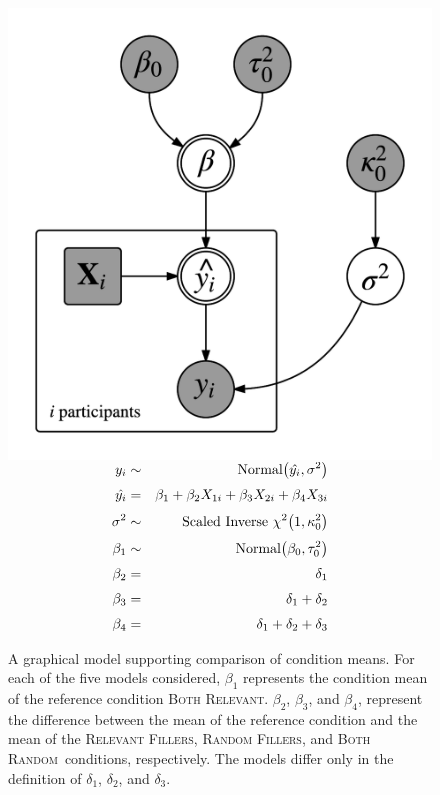 \documentclass[doc,12pt]{apa}
\newcommand{\relevant}{\textsc{Both Relevant}}
\newcommand{\relevantdata}{\textsc{Relevant Fillers}}
\newcommand{\randomdata}{\textsc{Random Fillers}}
\newcommand{\random}{\textsc{Both Random}}
\begin{document}
\begin{figure}[t]
\begin{minipage}{0.5\textwidth}
\includegraphics[scale=0.80]{graphicalmodel.png}
\end{minipage}
\begin{minipage}{0.5\textwidth}
\begin{eqnarray*}
\phantom{a} & \\[-10mm]
y_i &\sim& \textrm{Normal}\big(\hat{y_i}, \sigma^2\big) \\[\jot]
\hat{y_i} &=& \beta_1 + \beta_2 X_{1i} + \beta_3 X_{2i} + \beta_4 X_{3i}  \\[\jot]
\sigma^2 &\sim& \textrm{Scaled Inverse}\ \chi^2\big(1, \kappa_0^2\big) \\[\jot]
\beta_1 &\sim& \textrm{Normal}\big(\beta_0, \tau_0^2\big) \\[\jot]
\beta_2 &=& \delta_1 \\[\jot]
\beta_3 &=& \delta_1 + \delta_2 \\[\jot]
\beta_4 &=& \delta_1 + \delta_2 + \delta_3
\end{eqnarray*}
\end{minipage}
\caption{%
A graphical model supporting comparison of condition means. For each of the five models considered, $\beta_1$ represents the condition mean of the reference condition \relevant. $\beta_2$, $\beta_3$, and $\beta_4$, represent the difference between the mean of the reference condition and the mean of the \relevantdata, \randomdata, and \random\ conditions, respectively. The models differ only in the definition of $\delta_1$, $\delta_2$, and $\delta_3$.
}
\label{fig:graphicalmodel}
\end{figure}
\end{document}
